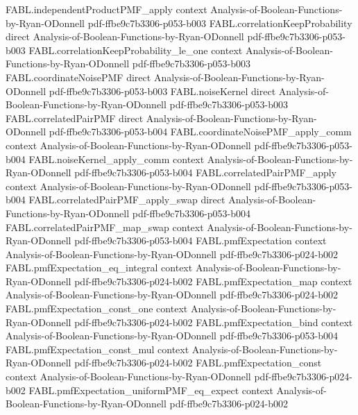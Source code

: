 \begin{theorem}
\proofstep
  {FABL.independentProductPMF_apply}
  {context}
  {Analysis-of-Boolean-Functions-by-Ryan-ODonnell}
  {pdf-ffbe9c7b3306-p053-b003}
\proofstep
  {FABL.correlationKeepProbability}
  {direct}
  {Analysis-of-Boolean-Functions-by-Ryan-ODonnell}
  {pdf-ffbe9c7b3306-p053-b003}
\proofstep
  {FABL.correlationKeepProbability_le_one}
  {context}
  {Analysis-of-Boolean-Functions-by-Ryan-ODonnell}
  {pdf-ffbe9c7b3306-p053-b003}
\proofstep
  {FABL.coordinateNoisePMF}
  {direct}
  {Analysis-of-Boolean-Functions-by-Ryan-ODonnell}
  {pdf-ffbe9c7b3306-p053-b003}
\proofstep
  {FABL.noiseKernel}
  {direct}
  {Analysis-of-Boolean-Functions-by-Ryan-ODonnell}
  {pdf-ffbe9c7b3306-p053-b003}
\proofstep
  {FABL.correlatedPairPMF}
  {direct}
  {Analysis-of-Boolean-Functions-by-Ryan-ODonnell}
  {pdf-ffbe9c7b3306-p053-b004}
\proofstep
  {FABL.coordinateNoisePMF_apply_comm}
  {context}
  {Analysis-of-Boolean-Functions-by-Ryan-ODonnell}
  {pdf-ffbe9c7b3306-p053-b004}
\proofstep
  {FABL.noiseKernel_apply_comm}
  {context}
  {Analysis-of-Boolean-Functions-by-Ryan-ODonnell}
  {pdf-ffbe9c7b3306-p053-b004}
\proofstep
  {FABL.correlatedPairPMF_apply}
  {context}
  {Analysis-of-Boolean-Functions-by-Ryan-ODonnell}
  {pdf-ffbe9c7b3306-p053-b004}
\proofstep
  {FABL.correlatedPairPMF_apply_swap}
  {direct}
  {Analysis-of-Boolean-Functions-by-Ryan-ODonnell}
  {pdf-ffbe9c7b3306-p053-b004}
\proofstep
  {FABL.correlatedPairPMF_map_swap}
  {context}
  {Analysis-of-Boolean-Functions-by-Ryan-ODonnell}
  {pdf-ffbe9c7b3306-p053-b004}
\proofstep
  {FABL.pmfExpectation}
  {context}
  {Analysis-of-Boolean-Functions-by-Ryan-ODonnell}
  {pdf-ffbe9c7b3306-p024-b002}
\proofstep
  {FABL.pmfExpectation_eq_integral}
  {context}
  {Analysis-of-Boolean-Functions-by-Ryan-ODonnell}
  {pdf-ffbe9c7b3306-p024-b002}
\proofstep
  {FABL.pmfExpectation_map}
  {context}
  {Analysis-of-Boolean-Functions-by-Ryan-ODonnell}
  {pdf-ffbe9c7b3306-p024-b002}
\proofstep
  {FABL.pmfExpectation_const_one}
  {context}
  {Analysis-of-Boolean-Functions-by-Ryan-ODonnell}
  {pdf-ffbe9c7b3306-p024-b002}
\proofstep
  {FABL.pmfExpectation_bind}
  {context}
  {Analysis-of-Boolean-Functions-by-Ryan-ODonnell}
  {pdf-ffbe9c7b3306-p053-b004}
\proofstep
  {FABL.pmfExpectation_const_mul}
  {context}
  {Analysis-of-Boolean-Functions-by-Ryan-ODonnell}
  {pdf-ffbe9c7b3306-p024-b002}
\proofstep
  {FABL.pmfExpectation_const}
  {context}
  {Analysis-of-Boolean-Functions-by-Ryan-ODonnell}
  {pdf-ffbe9c7b3306-p024-b002}
\proofstep
  {FABL.pmfExpectation_uniformPMF_eq_expect}
  {context}
  {Analysis-of-Boolean-Functions-by-Ryan-ODonnell}
  {pdf-ffbe9c7b3306-p024-b002}

\end{theorem}
